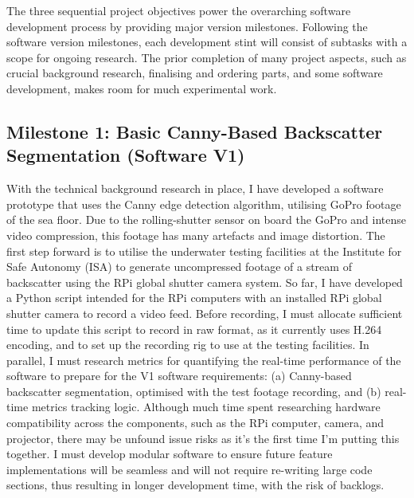 The three sequential project objectives power the overarching software development process by providing major version milestones. Following the software version milestones, each development stint will consist of subtasks with a scope for ongoing research. The prior completion of many project aspects, such as crucial background research, finalising and ordering parts, and some software development, makes room for much experimental work.

\subsection{Milestone 1: Basic Canny-Based Backscatter Segmentation (Software V1)}
With the technical background research in place, I have developed a software prototype that uses the Canny edge detection algorithm, utilising GoPro footage of the sea floor. Due to the rolling-shutter sensor on board the GoPro and intense video compression, this footage has many artefacts and image distortion. The first step forward is to utilise the underwater testing facilities at the Institute for Safe Autonomy (ISA) to generate uncompressed footage of a stream of backscatter using the RPi global shutter camera system. So far, I have developed a Python script intended for the RPi computers with an installed RPi global shutter camera to record a video feed. Before recording, I must allocate sufficient time to update this script to record in raw format, as it currently uses H.264 encoding, and to set up the recording rig to use at the testing facilities. In parallel, I must research metrics for quantifying the real-time performance of the software to prepare for the V1 software requirements: (a) Canny-based backscatter segmentation, optimised with the test footage recording, and (b) real-time metrics tracking logic. Although much time spent researching hardware compatibility across the components, such as the RPi computer, camera, and projector, there may be unfound issue risks as it's the first time I'm putting this together. I must develop modular software to ensure future feature implementations will be seamless and will not require re-writing large code sections, thus resulting in longer development time, with the risk of backlogs.

